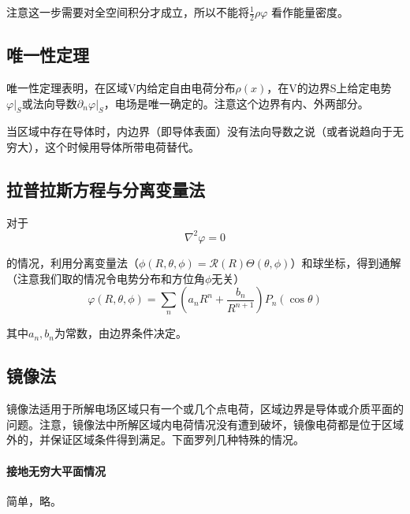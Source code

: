 \documentclass[UTF8]{ctexart}
\begin{document}
\noindent 注意这一步需要对全空间积分才成立，所以不能将$\frac{1}{2} \rho \varphi$ 看作能量密度。

    \subsection{唯一性定理}
    唯一性定理表明，在区域V内给定自由电荷分布$\rho(x)$，在V的边界S上给定电势$\varphi |_S$或法向导数$\partial_n \varphi|_S$，电场是唯一确定的。注意这个边界有内、外两部分。

    当区域中存在导体时，内边界（即导体表面）没有法向导数之说（或者说趋向于无穷大），这个时候用导体所带电荷替代。

    \subsection{拉普拉斯方程与分离变量法}
    对于
    \begin{equation}
        \nabla^2 \varphi = 0
    \end{equation}

\noindent 的情况，利用分离变量法（$\phi(R,\theta,\phi) = \mathcal{R}(R) \Theta(\theta,\phi)$）和球坐标，得到通解（注意我们取的情况令电势分布和方位角$\phi$无关）
\begin{equation}
    \varphi(R,\theta,\phi) = \sum_n \left(a_n R^n + \frac{b_n}{R^{n+1}}\right) P_n(\cos \theta)
\end{equation}

\noindent 其中$a_n,b_n$为常数，由边界条件决定。

    \subsection{镜像法}
    镜像法适用于所解电场区域只有一个或几个点电荷，区域边界是导体或介质平面的问题。注意，镜像法中所解区域内电荷情况没有遭到破坏，镜像电荷都是位于区域外的，并保证区域条件得到满足。下面罗列几种特殊的情况。

    \paragraph{接地无穷大平面情况}
    简单，略。
\end{document}
